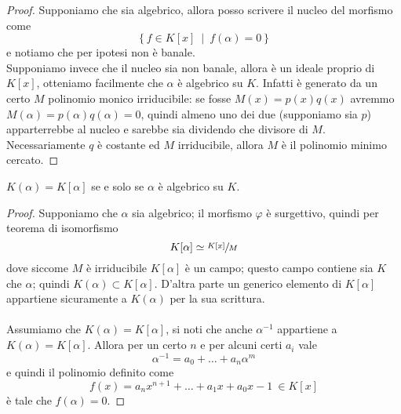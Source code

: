 \begin{proof}
	Supponiamo che sia algebrico, allora posso scrivere il nucleo del morfismo come 
	\begin{equation*}
	\left\{f\in K[x] \ \mid \ f(\alpha)=0\right\}
	\end{equation*}
	e notiamo che per ipotesi non è banale. \\ Supponiamo invece che il nucleo sia non banale, allora è un ideale proprio di $K[x]$, otteniamo facilmente che $\alpha$ è algebrico su $K$. Infatti è generato da un certo $M$ polinomio monico irriducibile: se fosse $M(x)=p(x)q(x)$ avremmo $M(\alpha)=p(\alpha)q(\alpha)=0$, quindi almeno uno dei due (supponiamo sia $p$) apparterrebbe al nucleo e sarebbe sia dividendo che divisore di $M$. %
	Necessariamente $q$ è costante ed $M$ irriducibile, allora $M$ è il polinomio minimo cercato.
\end{proof}
\begin{teorema}
	$K(\alpha)=K[\alpha]$ se e solo se $\alpha$ è algebrico su $K$.
\end{teorema}
\begin{proof}
	Supponiamo che $\alpha$ sia algebrico; il morfismo $\varphi$ è surgettivo, quindi per teorema di isomorfismo
	\begin{equation*}
	K[\alpha]\simeq\sfrac{K[x]}{M}
	\end{equation*}
	dove siccome $M$ è irriducibile $K[\alpha]$ è un campo; questo campo contiene sia $K$ che $\alpha$; quindi $K(\alpha)\subset K[\alpha]$. D'altra parte un generico elemento di $K[\alpha]$ appartiene sicuramente a $K(\alpha)$ per la sua scrittura. \\ \\
	Assumiamo che $K(\alpha)=K[\alpha]$, si noti che anche $\alpha^{-1}$ appartiene a $K(\alpha)=K[\alpha]$. Allora per un certo $n$ e per alcuni certi $a_i$ vale
	\begin{equation*}
	\alpha^{-1}=a_0+\dots+a_n\alpha^m
	\end{equation*}
	e quindi il polinomio definito come
	\begin{equation*}
	f(x)=a_nx^{n+1}+\dots+a_1x+a_0x-1 \ \in K[x]
	\end{equation*}
	è tale che $f(\alpha)=0$.
\end{proof}
